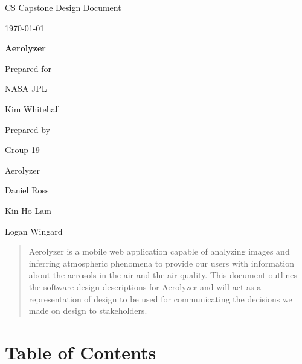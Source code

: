 \documentclass[onecolumn, draftclsnofoot,10pt, compsoc]{IEEEtran}
\def \CapstoneTeamName{		Aerolyzer}
\def \CapstoneTeamNumber{		19}
\def \GroupMemberOne{			Daniel Ross}
\def \GroupMemberTwo{			Kin-Ho Lam}
\def \GroupMemberThree{			Logan Wingard}
\def \CapstoneProjectName{		Aerolyzer}
\def \CapstoneSponsorCompany{	NASA JPL}
\def \CapstoneSponsorPerson{		Kim Whitehall}
\def \DocType{		%
	Design Document
}
\newcommand{\NameSigPair}[1]{\par
	\makebox[2.75in][r]{#1} \hfil 	\makebox[3.25in]{\makebox[2.25in]{\hrulefill} \hfill		\makebox[.75in]{\hrulefill}}
	\par\vspace{-12pt} \textit{\tiny\noindent
		\makebox[2.75in]{} \hfil		\makebox[3.25in]{\makebox[2.25in][r]{Signature} \hfill	\makebox[.75in][r]{Date}}}}
\renewcommand{\NameSigPair}[1]{#1}
\begin{document}
	\begin{titlepage}
		\begin{singlespace}
			\hfill 
			\par\vspace{.2in}
			\centering
			\scshape{
				\huge CS Capstone \DocType \par
				{\large\today}\par
				\vspace{.5in}
				\textbf{\Huge\CapstoneProjectName}\par
				\vfill
				{\large Prepared for}\par
				\Huge \CapstoneSponsorCompany\par
				\vspace{5pt}
				{\Large\NameSigPair{\CapstoneSponsorPerson}\par}
				{\large Prepared by }\par
				Group\CapstoneTeamNumber\par
				\CapstoneTeamName\par 
				\vspace{5pt}
				{\large
					\NameSigPair{\GroupMemberOne}\par
					\NameSigPair{\GroupMemberTwo}\par
					\NameSigPair{\GroupMemberThree}\par
				}
				\vspace{20pt}
			}
			\begin{abstract}
				Aerolyzer is a mobile web application capable of analyzing images and inferring atmospheric phenomena to provide our users with information about the aerosols in the air and the air quality. This document outlines the software design descriptions for Aerolyzer and will act as a representation of design to be used for communicating the decisions we made on design to stakeholders. 
			\end{abstract}     
		\end{singlespace}
	\end{titlepage}

\section{Table of Contents}
\tableofcontents
\clearpage
\end{document}

